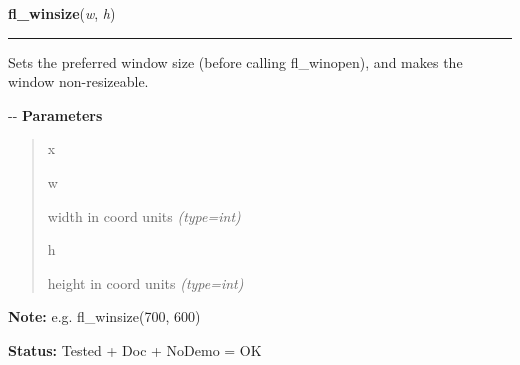 \hspace{.8\funcindent}\begin{boxedminipage}{\funcwidth}

    \raggedright \textbf{fl\_winsize}(\textit{w}, \textit{h})

    \vspace{-1.5ex}

    \rule{\textwidth}{0.5\fboxrule}
\setlength{\parskip}{2ex}

Sets the preferred window size (before calling fl\_winopen), and
makes the window non-resizeable.

-{}-
\setlength{\parskip}{1ex}
      \textbf{Parameters}
      \vspace{-1ex}

      \begin{quote}
        \begin{Ventry}{x}

          \item[w]


width in coord units
            {\it (type=int)}

          \item[h]


height in coord units
            {\it (type=int)}

        \end{Ventry}

      \end{quote}

\textbf{Note:} 
e.g. fl\_winsize(700, 600)


\textbf{Status:} 
Tested + Doc + NoDemo = OK


    \end{boxedminipage}

    \label{xformslib:flxbasic:fl_winsize}

    \vspace{0.5ex}

